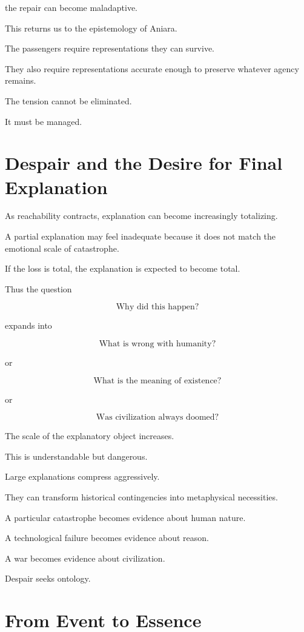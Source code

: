 \documentclass[11pt,oneside]{book}
\theoremstyle{definition}
\theoremstyle{remark}
\begin{document}
the repair can become maladaptive.

This returns us to the epistemology of Aniara.

The passengers require representations they can survive.

They also require representations accurate enough to preserve whatever agency remains.

The tension cannot be eliminated.

It must be managed.

\section{Despair and the Desire for Final Explanation}

As reachability contracts, explanation can become increasingly totalizing.

A partial explanation may feel inadequate because it does not match the emotional scale of catastrophe.

If the loss is total, the explanation is expected to become total.

Thus the question

\[
\text{Why did this happen?}
\]

expands into

\[
\text{What is wrong with humanity?}
\]

or

\[
\text{What is the meaning of existence?}
\]

or

\[
\text{Was civilization always doomed?}
\]

The scale of the explanatory object increases.

This is understandable but dangerous.

Large explanations compress aggressively.

They can transform historical contingencies into metaphysical necessities.

A particular catastrophe becomes evidence about human nature.

A technological failure becomes evidence about reason.

A war becomes evidence about civilization.

Despair seeks ontology.

\section{From Event to Essence}
\end{document}
